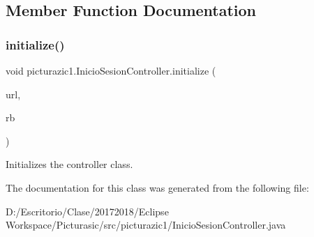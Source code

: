 \subsection{Member Function Documentation}
\mbox{\label{classpicturazic1_1_1_inicio_sesion_controller_a879e972a8f81ff3e4edc41244d371a25}} 
\subsubsection{\texorpdfstring{initialize()}{initialize()}}
{\footnotesize\ttfamily void picturazic1.\+Inicio\+Sesion\+Controller.\+initialize (\begin{DoxyParamCaption}\item[{U\+RL}]{url,  }\item[{Resource\+Bundle}]{rb }\end{DoxyParamCaption})}

Initializes the controller class. 

The documentation for this class was generated from the following file\+:\begin{DoxyCompactItemize}
\item 
D\+:/\+Escritorio/\+Clase/20172018/\+Eclipse Workspace/\+Picturasic/src/picturazic1/Inicio\+Sesion\+Controller.\+java\end{DoxyCompactItemize}
